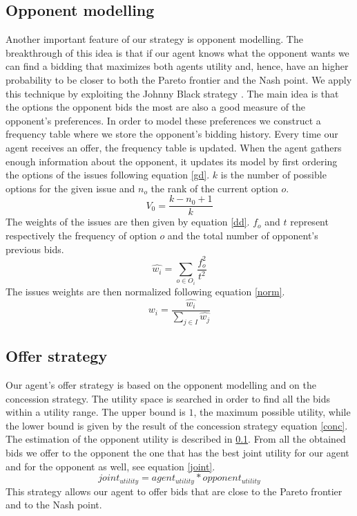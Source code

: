 \documentclass[runningheads]{llncs}
\begin{document}
\subsection{Opponent modelling}\label{opmod}
Another important feature of our strategy is opponent modelling. The
breakthrough of this idea is that if our agent knows what the opponent
wants we can find a bidding that maximizes both agents utility
and, hence, have an higher probability to be closer to both the
Pareto frontier and the Nash point. We apply this technique by
exploiting the Johnny Black strategy \cite{black}. The main idea is
that the options the opponent bids the most are also a good measure of
the opponent's preferences. In order to model these preferences we
construct a frequency table where we store the opponent's bidding
history. Every time our agent receives an offer, the frequency
table is updated. When the agent gathers enough information about the
opponent, it updates its 
model by first ordering the options of the issues following
equation \ref{gd}. $k$ is the number of possible options for the
given issue and $n_o$ the rank of the current option $o$.
\begin{equation}\label{gd}
  V_0 = \frac{k - n_0 + 1}{k}
\end{equation}
The weights of the issues are then given by equation \ref{dd}. $f_o$ and $t$ represent respectively the frequency of option $o$ and
the total number of opponent's previous bids.
\begin{equation}\label{dd}
  \hat{w_i} = \sum_{o \in O_i} \frac{f_o^2}{t^2}
\end{equation}
The issues weights are then normalized following equation \ref{norm}.
\begin{equation}\label{norm}
w_i = \frac{\hat{w_i}}{\sum_{j \in I} \hat{w_j}}
\end{equation}

\subsection{Offer strategy}
Our agent's offer strategy is based on the opponent modelling and on
the concession strategy. The utility space is searched in order to
find all the bids within a utility range. The upper bound is $1$, the
maximum possible utility, while the lower bound is given by the result
of the concession strategy equation \ref{conc}. The estimation of the
opponent utility is described in \ref{opmod}. From all the obtained
bids we offer to the opponent the one that has the best joint utility for
our agent and for the opponent as well, see equation \ref{joint}.
\begin{equation}\label{joint}
  joint_{utility} = agent_{utility} * opponent_{utility}
\end{equation}
This strategy allows our agent to offer bids that are close to the
Pareto frontier and to the Nash point. 
\end{document}
